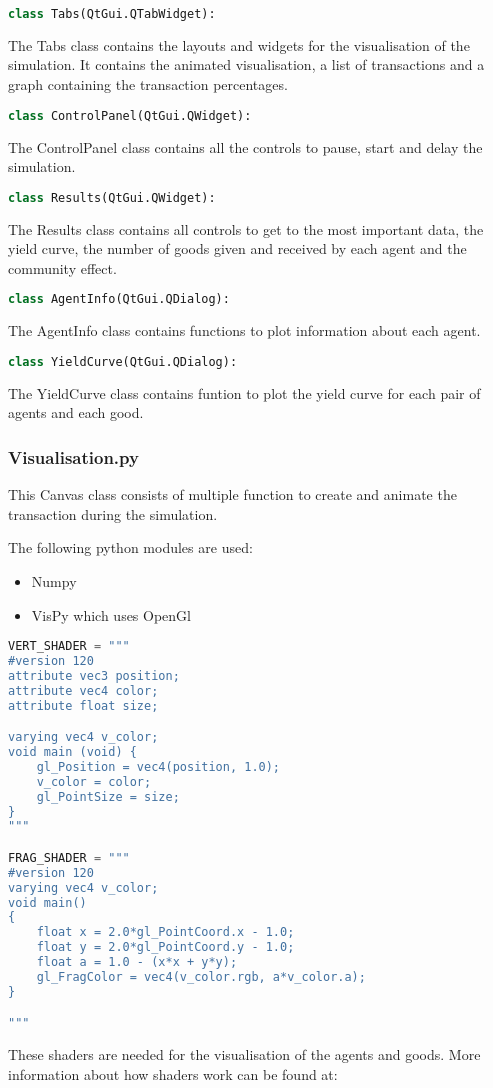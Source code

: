 \documentclass{article}
\begin{document}
\begin{lstlisting}[language=Python]
class Tabs(QtGui.QTabWidget):
\end{lstlisting}
The Tabs class contains the layouts and widgets for the visualisation of the simulation. It contains the animated visualisation, a list of transactions and a graph containing the transaction percentages.

\begin{lstlisting}[language=Python]
class ControlPanel(QtGui.QWidget):
\end{lstlisting}
The ControlPanel class contains all the controls to pause, start and delay the simulation.

\begin{lstlisting}[language=Python]
class Results(QtGui.QWidget):
\end{lstlisting}
The Results class contains all controls to get to the most important data, the yield curve, the number of goods given and received by each agent and the community effect.

\begin{lstlisting}[language=Python]
class AgentInfo(QtGui.QDialog):
\end{lstlisting}
The AgentInfo class contains functions to plot information about each agent. 

\begin{lstlisting}[language=Python]
class YieldCurve(QtGui.QDialog):
\end{lstlisting}
The YieldCurve class contains funtion to plot the yield curve for each pair of agents and each good.

\subsubsection{Visualisation.py}
This Canvas class consists of multiple function to create and animate the transaction during the simulation.

The following python modules are used:
\begin{itemize}
  \item Numpy
  \item VisPy which uses OpenGl
\end{itemize}

\begin{lstlisting}[language=Python]
VERT_SHADER = """
#version 120
attribute vec3 position;
attribute vec4 color;
attribute float size;

varying vec4 v_color;
void main (void) {
    gl_Position = vec4(position, 1.0);
    v_color = color;
    gl_PointSize = size;
}
"""

FRAG_SHADER = """
#version 120
varying vec4 v_color;
void main()
{
    float x = 2.0*gl_PointCoord.x - 1.0;
    float y = 2.0*gl_PointCoord.y - 1.0;
    float a = 1.0 - (x*x + y*y);
    gl_FragColor = vec4(v_color.rgb, a*v_color.a);
}

"""
\end{lstlisting}
These shaders are needed for the visualisation of the agents and goods. More information about how shaders work can be found at:
\end{document}
